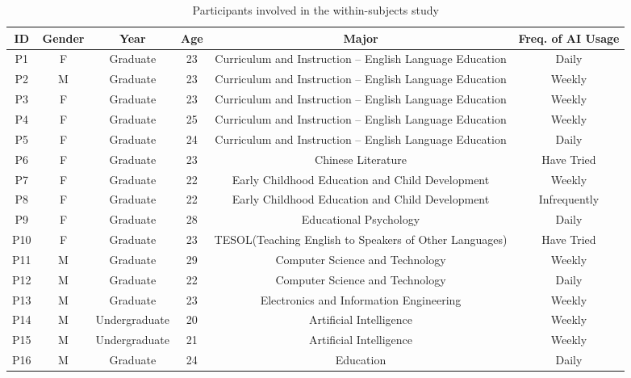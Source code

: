 \begin{table*}[h]
\caption{Participants involved in the within-subjects study}
\begin{tabular}{@{}cccccc@{}}
\toprule
\textbf{ID} & \textbf{Gender} & \textbf{Year} & \textbf{Age} & \textbf{Major}                                         & \textbf{Freq. of AI Usage} \\ \midrule
P1  & F & Graduate      & 23 & Curriculum and Instruction – English Language Education & Daily        \\
P2  & M & Graduate      & 23 & Curriculum and Instruction – English Language Education & Weekly       \\
P3  & F & Graduate      & 23 & Curriculum and Instruction – English Language Education & Weekly       \\
P4  & F & Graduate      & 25 & Curriculum and Instruction – English Language Education & Weekly       \\
P5  & F & Graduate      & 24 & Curriculum and Instruction – English Language Education & Daily        \\
P6  & F & Graduate      & 23 & Chinese Literature                                      & Have Tried   \\
P7  & F & Graduate      & 22 & Early Childhood Education and Child Development         & Weekly       \\
P8  & F & Graduate      & 22 & Early Childhood Education and Child Development         & Infrequently \\
P9  & F & Graduate      & 28 & Educational Psychology                                  & Daily        \\
P10         & F               & Graduate      & 23           & TESOL(Teaching English to Speakers of Other Languages) & Have Tried                 \\
P11 & M & Graduate      & 29 & Computer Science and Technology                         & Weekly       \\
P12 & M & Graduate      & 22 & Computer Science and Technology                         & Daily        \\
P13 & M & Graduate      & 23 & Electronics and Information Engineering                 & Weekly       \\
P14 & M & Undergraduate & 20 & Artificial Intelligence                                 & Weekly       \\
P15 & M & Undergraduate & 21 & Artificial Intelligence                                 & Weekly       \\
P16 & M & Graduate      & 24 & Education                                               & Daily        \\ \bottomrule
\end{tabular}
\end{table*}

